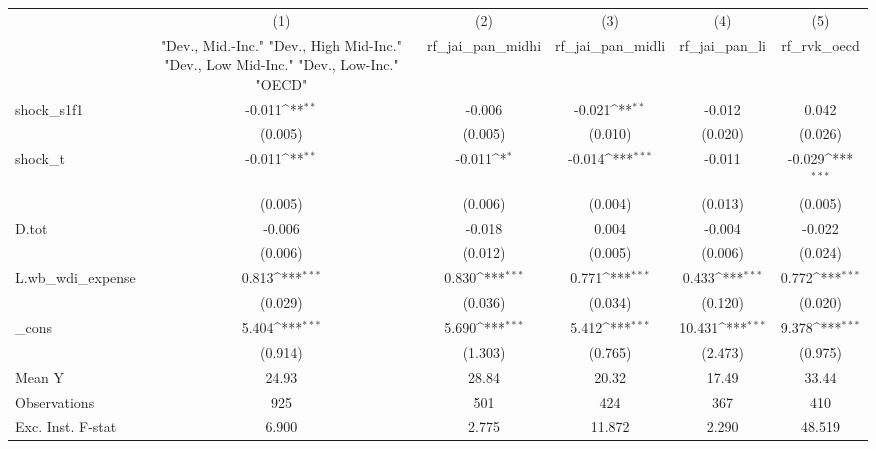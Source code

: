 {
\def\sym#1{\ifmmode^{#1}\else\(^{#1}\)\fi}
\begin{tabular}{l*{5}{c}}
\toprule
            &\multicolumn{1}{c}{(1)}&\multicolumn{1}{c}{(2)}&\multicolumn{1}{c}{(3)}&\multicolumn{1}{c}{(4)}&\multicolumn{1}{c}{(5)}\\
            &\multicolumn{1}{c}{ "Dev., Mid.-Inc." "Dev., High Mid-Inc." "Dev., Low Mid-Inc." "Dev., Low-Inc." "OECD" }&\multicolumn{1}{c}{rf\_jai\_pan\_midhi}&\multicolumn{1}{c}{rf\_jai\_pan\_midli}&\multicolumn{1}{c}{rf\_jai\_pan\_li}&\multicolumn{1}{c}{rf\_rvk\_oecd}\\
\midrule
shock\_s1f1  &      -0.011\sym{**} &      -0.006         &      -0.021\sym{**} &      -0.012         &       0.042         \\
            &     (0.005)         &     (0.005)         &     (0.010)         &     (0.020)         &     (0.026)         \\
\addlinespace
shock\_t     &      -0.011\sym{**} &      -0.011\sym{*}  &      -0.014\sym{***}&      -0.011         &      -0.029\sym{***}\\
            &     (0.005)         &     (0.006)         &     (0.004)         &     (0.013)         &     (0.005)         \\
\addlinespace
D.tot       &      -0.006         &      -0.018         &       0.004         &      -0.004         &      -0.022         \\
            &     (0.006)         &     (0.012)         &     (0.005)         &     (0.006)         &     (0.024)         \\
\addlinespace
L.wb\_wdi\_expense&       0.813\sym{***}&       0.830\sym{***}&       0.771\sym{***}&       0.433\sym{***}&       0.772\sym{***}\\
            &     (0.029)         &     (0.036)         &     (0.034)         &     (0.120)         &     (0.020)         \\
\addlinespace
\_cons      &       5.404\sym{***}&       5.690\sym{***}&       5.412\sym{***}&      10.431\sym{***}&       9.378\sym{***}\\
            &     (0.914)         &     (1.303)         &     (0.765)         &     (2.473)         &     (0.975)         \\
\midrule
Mean Y      &       24.93         &       28.84         &       20.32         &       17.49         &       33.44         \\
Observations&         925         &         501         &         424         &         367         &         410         \\
Exc. Inst. F-stat&       6.900         &       2.775         &      11.872         &       2.290         &      48.519         \\
\bottomrule
\end{tabular}
}
